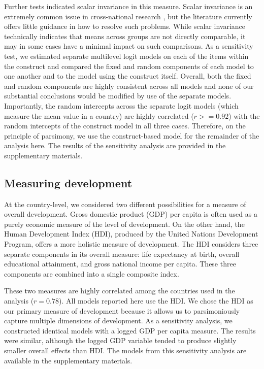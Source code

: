 \documentclass[10pt,letterpaper]{article}
\begin{document}
Further tests indicated scalar invariance in this measure. Scalar invariance is an extremely common issue in cross-national research \cite{meitinger_measurement_2020}, but the literature currently offers little guidance in how to resolve such problems. While scalar invariance technically indicates that means across groups are not directly comparable, it may in some cases have a minimal impact on such comparisons. As a sensitivity test, we estimated separate multilevel logit models on each of the items within the construct and compared the fixed and random components of each model to one another and to the model using the construct itself. Overall, both the fixed and random components are highly consistent across all models and none of our substantial conclusions would be modified by use of the separate models. Importantly, the random intercepts across the separate logit models (which measure the mean value in a country) are highly correlated (\(r>=0.92\)) with the random intercepts of the construct model in all three cases. Therefore, on the principle of parsimony, we use the construct-based model for the remainder of the analysis here. The results of the sensitivity analysis are provided in the supplementary materials.

\subsection*{Measuring development}

At the country-level, we considered two different possibilities for a measure of overall development. Gross domestic product (GDP) per capita is often used as a purely economic measure of the level of development. On the other hand, the Human Development Index (HDI), produced by the United Nations Development Program, offers a more holistic measure of development. The HDI considers three separate components in its overall measure: life expectancy at birth, overall educational attainment, and gross national income per capita. These three components are combined into a single composite index.

These two measures are highly correlated among the countries used in the analysis (\(r=0.78\)). All models reported here use the HDI. We chose the HDI as our primary measure of development because it allows us to parsimoniously capture multiple dimensions of development. As a sensitivity analysis, we constructed identical models with a logged GDP per capita measure. The results were similar, although the logged GDP variable tended to produce slightly smaller overall effects than HDI. The models from this sensitivity analysis are available in the supplementary materials.
\end{document}

